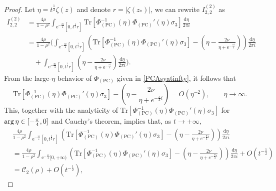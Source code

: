 \documentclass[11pt,a4paper]{article}
\numberwithin{equation}{section}
\def\arg {\mathop{\rm arg}\nolimits}
\begin{document}
\begin{proof}
Let $\eta=t^{\frac{1}{2}}\zeta(z)$ and denote $r=|\zeta(z_*)|$, we can rewrite $I^{(2)}_{2,2}$ as
\begin{align}
I^{(2)}_{2,2}&=\frac{4\rho}{1-\rho^2}\int_{\mathrm{e}^{-\frac{\pi i}{4}}[0,t^{\frac{1}{2}}r]}
\mathrm{Tr}\left[\Phi_{(\mathrm{PC})}^{-1}(\eta)
\Phi_{(\mathrm{PC})}'(\eta)\sigma_3\right]\frac{\mathrm{d}\eta}{2\pi i}
\nonumber \\
&=\frac{4\rho }{1-\rho^2}\Bigg(\int_{\mathrm{e}^{-\frac{\pi i}{4}}[0,t^{\frac{1}{2}}r]}
\left(\mathrm{Tr}\left[\Phi_{(\mathrm{PC})}^{-1}(\eta)
\Phi_{(\mathrm{PC})}'(\eta)\sigma_3\right]
-\left(\eta-\frac{2\nu}{\eta+\mathrm{e}^{-\frac{\pi i}{4}}}\right)\right)
\frac{\mathrm{d}\eta}{2\pi i} \nonumber \\
&\quad+\int_{\mathrm{e}^{-\frac{\pi i}{4}}[0,t^{\frac{1}{2}}r]}\left(\eta-\frac{2\nu}{\eta+\mathrm{e}^{-\frac{\pi i}{4}}}\right)\frac{\mathrm{d}\eta}{2\pi i} \Bigg). \label{eq:estI2221}
\end{align}
From the large-$\eta$ behavior of $\Phi_{(\mathrm{PC})}$ given in
\eqref{PCAsyatinfty}, it follows that
$$
\mathrm{Tr}\left[\Phi_{(\mathrm{PC})}^{-1}(\eta)\Phi_{(\mathrm{PC})}'(\eta)\sigma_3\right]
-\left(\eta-\frac{2\nu}{\eta+e^{-\frac{\pi}{4}i}}\right)=O\left(\eta^{-2}\right), \qquad \eta\to\infty.
$$
This, together with the analyticity of $\mathrm{Tr}\left[\Phi_{(\mathrm{PC})}^{-1}(\eta)\Phi_{(\mathrm{PC})}'(\eta)\sigma_3\right]$ for $\arg \eta\in[-\frac{\pi}{4}, 0]$ and Cauchy's theorem, implies that, as $t\to +\infty$,
\begin{align*}
&\frac{4\rho }{1-\rho^2}\int_{\mathrm{e}^{-\frac{\pi i}{4}}[0,t^{\frac{1}{2}}r]}\left(\mathrm{Tr}\left[\Phi_{(\mathrm{PC})}^{-1}(\eta)
\Phi_{(\mathrm{PC})}'(\eta)\sigma_3\right]-\left(\eta-\frac{2\nu}{\eta+e^{-\frac{\pi}{4}i}}\right)\right)
\frac{\mathrm{d}\eta}{2\pi i}\\
&=\frac{4\rho }{1-\rho^2}\int_{\mathrm{e}^{-\frac{\pi i}{4}}[0,+\infty)}\left(\mathrm{Tr}\left[\Phi_{(\mathrm{PC})}^{-1}(\eta)
\Phi_{(\mathrm{PC})}'(\eta)\sigma_3\right]-\left(\eta-\frac{2\nu}{\eta+e^{-\frac{\pi}{4}i}}\right)\right)
\frac{\mathrm{d}\eta}{2\pi i}+O\left(t^{-\frac{1}{2}}\right)
\\
&=\mathcal{C}_2(\rho) +O\left(t^{-\frac{1}{2}}\right),
\end{align*}

\end{proof}
\end{document}
